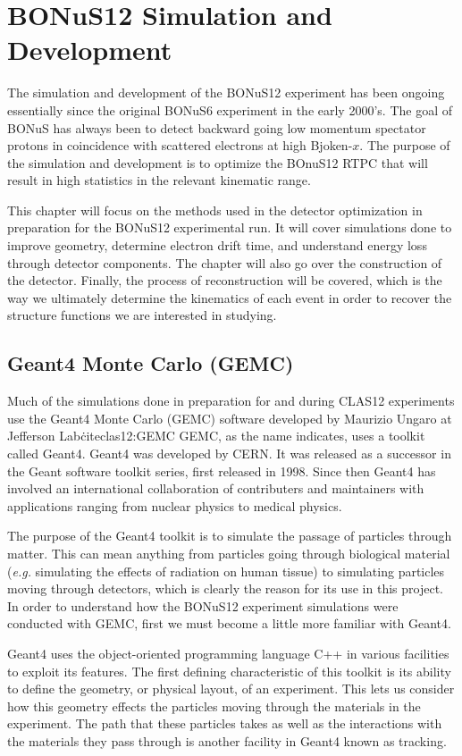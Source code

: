 \chapter{BONuS12 Simulation and Development}
\label{ch:sim}
The simulation and development of the BONuS12 experiment has been ongoing essentially since the original BONuS6 experiment in the early 2000's. The goal of BONuS has always been to detect backward going low momentum spectator protons in coincidence with scattered electrons at high Bjoken-$x$. The purpose of the simulation and development is to optimize the BOnuS12 RTPC that will result in high statistics in the relevant kinematic range.

This chapter will focus on the methods used in the detector optimization in preparation for the BONuS12 experimental run. It will cover simulations done to improve geometry, determine  electron drift time, and understand energy loss through detector components. The chapter will also go over the construction of the detector. Finally, the process of reconstruction will be covered, which is the way we ultimately determine the kinematics of each event in order to recover the structure functions we are interested in studying.

\section{Geant4 Monte Carlo (GEMC)}
\label{sec:gemc}
Much of the simulations done in preparation for and during CLAS12 experiments use the Geant4 Monte Carlo (GEMC) software developed by Maurizio Ungaro at Jefferson Lab\.cite{clas12:GEMC} GEMC, as the name indicates, uses a toolkit called Geant4. Geant4 was developed by CERN. It was released as a successor in the Geant software toolkit series, first released in 1998. Since then Geant4 has involved an international collaboration of contributers and maintainers with applications ranging from nuclear physics to medical physics.

The purpose of the Geant4 toolkit \cite{geant4} is to simulate the passage of particles through matter. This can mean anything from particles going through biological material (\textit{e.g.} simulating the effects of radiation on human tissue) to simulating particles moving through detectors, which is clearly the reason for its use in this project. In order to understand how the BONuS12 experiment simulations were conducted with GEMC, first we must become a little more familiar with Geant4.

Geant4 uses the object-oriented programming language C++ in various facilities to exploit its features. The first defining characteristic of this toolkit is its ability to define the geometry, or physical layout, of an experiment. This lets us consider how this geometry effects the particles moving through the materials in the experiment. The path that these particles takes as well as the interactions with the materials they pass through is another facility in Geant4 known as tracking.

